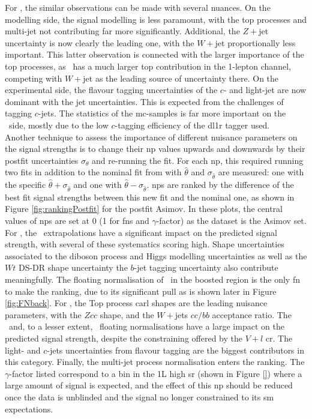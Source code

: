 For \vhc, the similar observations can be made with several nuances. On the modelling side, the signal modelling is less paramount, with the top processes and multi-jet not contributing far more significantly. Additional, the $Z+$jet uncertainty is now clearly the leading one, with the $W+$jet proportionally less important. This latter observation is connected with the larger importance of the top processes, as \vhc\ has a much larger top contribution in the 1-lepton channel, competing with $W+$jet as the leading source of uncertainty there. On the experimental side, the flavour tagging uncertainties of the $c$- and light-jet are now dominant with the jet uncertainties. This is expected from the challenges of tagging $c$-jets. The statistics of the \gls{mc}-samples is far more important on the \vhc\ side, mostly due to the low $c$-tagging efficiency of the \gls{dl1r} tagger used. \\

Another technique to assess the importance of different nuisance parameters on the signal strengths is to change their \gls{np} values upwards and downwards by their postfit uncertainties $\sigma_{\theta}$ and re-running the fit. For each \gls{np}, this required running two fits in addition to the nominal fit from with $\hat{\theta}$ and $\sigma_{\hat{\theta}}$ are measured: one with the specific $\hat{\theta} + \sigma_{\hat{\theta}}$ and one with $\hat{\theta} - \sigma_{\hat{\theta}}$. \gls{np}s are ranked by the difference of the best fit signal strengths between this new fit and the nominal one, as shown in Figure \ref{fig:rankingPostfit} for the postfit Asimov. In these plots, the central values of \gls{np}s are set at 0 (1 for \gls{fn}s and $\gamma$-factor) as the dataset is the Asimov set. For \vhb, the \whf\ extrapolations have a significant impact on the predicted signal strength, with several of these systematics scoring high. Shape uncertainties associated to the diboson process and Higgs modelling uncertainties as well as the $Wt$ DS-DR shape uncertainty the $b$-jet tagging uncertainty also contribute meaningfully. The floating normalisation of \whf\ in the boosted region is the only \gls{fn} to make the ranking, due to its significant pull as is shown later in Figure \ref{fig:FNback}. For \vhc, the Top process \gls{carl} shapes are the leading nuisance parameters, with the $Zcc$ shape, and the $W+$jets $cc/bb$ acceptance ratio. The \zlf\ and, to a lesser extent, \wlf\ floating normalisations have a large impact on the predicted signal strength, despite the constraining offered by the $V+l$ \gls{cr}. The light- and $c$-jets uncertainties from flavour tagging are the biggest contributors in this category. Finally, the multi-jet process normalisation enters the ranking. The $\gamma$-factor listed correspond to a bin in the 1L high \ptv \gls{sr} (shown in Figure \ref{}) where a large amount of signal is expected, and the effect of this \gls{np} should be reduced once the data is unblinded and the signal no longer constrained to its \gls{sm} expectations.

